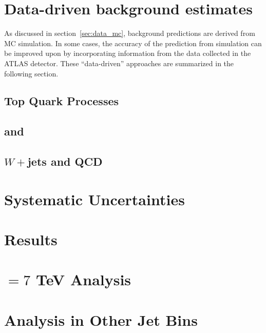 \section{Data-driven background estimates}
\label{chap:analysis:sec:dd_backgrounds}

As discussed in section~\ref{sec:data_mc}, background predictions are
derived from MC simulation. In some cases, the accuracy of the
prediction from simulation can be improved upon by incorporating
information from the data collected in the ATLAS detector. These
``data-driven'' approaches are summarized in the following section.

\subsection{Top Quark Processes}
\label{chap:analysis:sec:dd_backgrounds:subsec:top}
%

%

%

\subsection{\ZDYll and \Ztautau}
%

\subsection{$W+$jets and QCD}
%

\section{Systematic Uncertainties}
\label{chap:analysis:sec:systematics}


\section{Results}
\label{chap:analysis:sec:results}


\section{\sqrts$=7$ TeV Analysis}
\label{chap:analysis:sec:reanalysis}

\section{\hwwlnln Analysis in Other Jet Bins}
\label{chap:analysis:sec:zero_one_jet}




